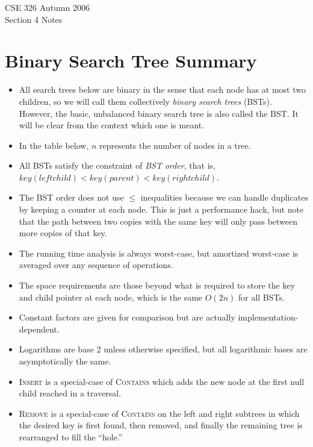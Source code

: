 \documentclass{article}[10pth]
\begin{document}
\begin{center}
\Large{CSE 326 Autumn 2006}\\
\large{Section 4 Notes}
\end{center}

\section{Binary Search Tree Summary}

\begin{itemize}
\item
All search trees below are binary in the sense that each node has at most
two children, so we will call them collectively \textit{binary search trees}
(BSTs). However, the basic, unbalanced binary search tree is also called the
BST. It will be clear from the context which one is meant.
\item
In the table below, $n$ represents the number of nodes in a tree.
\item
All BSTs satisfy the constraint of \textit{BST order}, that is,
$key(leftchild) < key(parent) < key(rightchild)$.
\item
The BST order does not use $\le$ inequalities because we can handle
duplicates by keeping a counter at each node. This is just a
performance hack, but note that the path between two copies with the
same key will only pass between more copies of that key.
\item
The running time analysis is always worst-case, but amortized worst-case
is averaged over any sequence of operations.
\item
The space requirements are those beyond what is required to store the
key and child pointer at each node, which is the same $O(2n)$ for all BSTs.
\item
Constant factors are given for comparison but are actually
implementation-dependent.
\item
Logarithms are base 2 unless otherwise specified, but all logarithmic
bases are asymptotically the same.
\item
\textsc{Insert} is a special-case of \textsc{Contains} which adds the new
node at the first null child reached in a traversal.
\item
\textsc{Remove} is a special-case of \textsc{Contains} on the left and
right subtrees in which the desired key is first found, then removed, and
finally the remaining tree is rearranged to fill the ``hole.''
\end{itemize}
\end{document}
